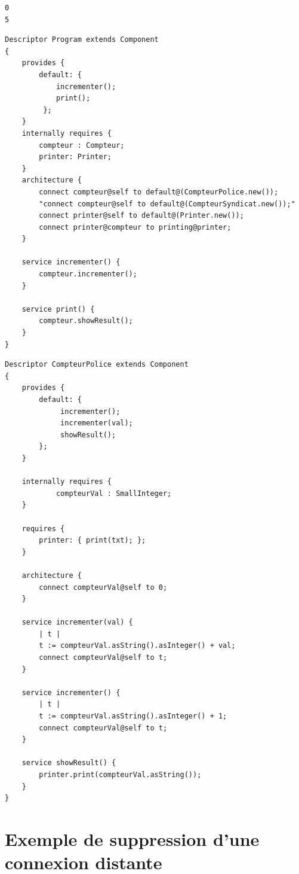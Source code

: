 \documentclass[11pt,a4paper,openany,oneside]{book}
\begin{document}
\begin{appendices}
\begin{lstlisting}[language=Compo, frame=single, caption=output (Avec le \texttt{CompteurSyndicat})]
0
5
\end{lstlisting}


\begin{lstlisting}[language=Compo, frame=single, caption=Programme utilisant un compteur, label=program]
Descriptor Program extends Component
{
	provides {
		default: {
			incrementer();
			print();
		 };
	}
	internally requires {
		compteur : Compteur;
		printer: Printer;
	}
	architecture {
        connect compteur@self to default@(CompteurPolice.new());
	    "connect compteur@self to default@(CompteurSyndicat.new());"
        connect printer@self to default@(Printer.new());
        connect printer@compteur to printing@printer;
	}
	
	service incrementer() {
		compteur.incrementer();
	}
	
	service print() {
		compteur.showResult();
	}
}
\end{lstlisting}

\newpage
\begin{lstlisting}[language=Compo, frame=single, caption=Compteur de la Police]
Descriptor CompteurPolice extends Component
{
	provides {
		default: {
			 incrementer(); 
			 incrementer(val); 
			 showResult();
		};
	}
	
	internally requires {
			compteurVal : SmallInteger;
	}
	
	requires {
		printer: { print(txt); };
	}
	
	architecture {
	    connect compteurVal@self to 0;
	}
	
	service incrementer(val) {
	    | t |
	    t := compteurVal.asString().asInteger() + val;
	    connect compteurVal@self to t;
	}
	
	service incrementer() {
	    | t |
	    t := compteurVal.asString().asInteger() + 1;
	    connect compteurVal@self to t;
	}
	
	service showResult() {
		printer.print(compteurVal.asString());
	}
}
\end{lstlisting}

\chapter{Exemple de suppression d'une connexion distante}


\label{deconnexiondistante}


\end{appendices}
\end{document}
